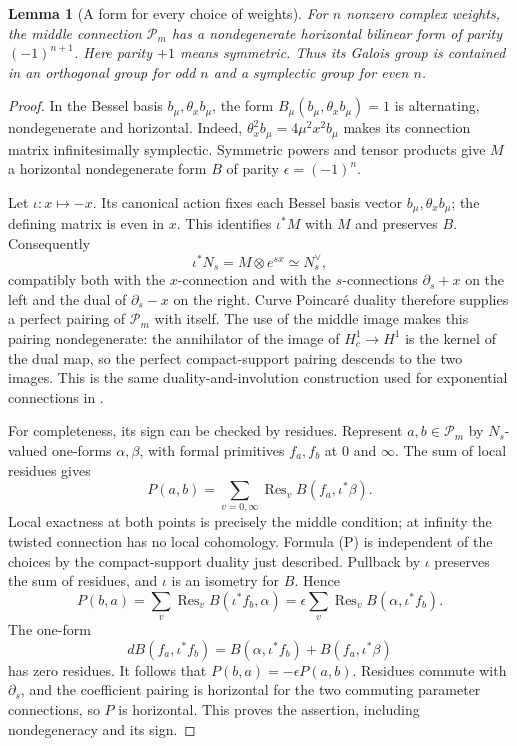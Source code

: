 \documentclass[11pt,a4paper]{article}
\newtheorem{lemma}[theorem]{Lemma}
\theoremstyle{definition}
\theoremstyle{remark}
\numberwithin{equation}{section}
\begin{document}
\begin{lemma}[A form for every choice of weights]\label{p7:fs:pairing}
For $n$ nonzero complex weights, the middle connection $\mathcal P_m$
has a nondegenerate horizontal bilinear form of parity $(-1)^{n+1}$.
Here parity $+1$ means symmetric. Thus its Galois group is contained
in an orthogonal group for odd $n$ and a symplectic group for even $n$.
\end{lemma}
\begin{proof}
In the Bessel basis $b_\mu,\theta_xb_\mu$, the form
$B_\mu(b_\mu,\theta_xb_\mu)=1$ is alternating, nondegenerate and
horizontal. Indeed, $\theta_x^2b_\mu=4\mu^2x^2b_\mu$ makes its
connection matrix infinitesimally symplectic. Symmetric powers and
tensor products give $M$ a horizontal nondegenerate form $B$ of
parity $\epsilon=(-1)^n$.

Let $\iota:x\mapsto-x$. Its canonical action fixes each Bessel
basis vector $b_\mu,\theta_xb_\mu$; the defining matrix is even in
$x$. This identifies $\iota^*M$ with $M$ and preserves $B$.
Consequently
\[
 \iota^*N_s=M\otimes e^{sx}\simeq N_s^\vee,
\]
compatibly both with the $x$-connection and with the $s$-connections
$\partial_s+x$ on the left and the dual of $\partial_s-x$ on the
right. Curve Poincar\'e duality therefore supplies a perfect pairing
of $\mathcal P_m$ with itself. The use of the middle image makes
this pairing nondegenerate: the annihilator of the image of
$H_c^1\to H^1$ is the kernel of the dual map, so the perfect
compact-support pairing descends to the two images. This is the
same duality-and-involution construction used for exponential
connections in \cite[\S2, especially (2.12) and Corollary 2.15]{p6:FS_FSY2022}.

For completeness, its sign can be checked by residues. Represent
$a,b\in\mathcal P_m$ by $N_s$-valued one-forms $\alpha,\beta$,
with formal primitives $f_a,f_b$ at $0$ and $\infty$.
The sum of local residues gives
\[
 P(a,b)=\sum_{v=0,\infty}\operatorname{Res}_v
                         B(f_a,\iota^*\beta).
 \tag{P}
\]
Local exactness at both points is precisely the middle condition;
at infinity the twisted connection has no local cohomology.
Formula (P) is independent of the choices by the compact-support
duality just described. Pullback by $\iota$ preserves the sum of
residues, and $\iota$ is an isometry for $B$. Hence
\[
 P(b,a)=\sum_v\operatorname{Res}_v B(\iota^*f_b,\alpha)
       =\epsilon\sum_v\operatorname{Res}_v B(\alpha,\iota^*f_b).
\]
The one-form
\[
 dB(f_a,\iota^*f_b)
       =B(\alpha,\iota^*f_b)+B(f_a,\iota^*\beta)
\]
has zero residues. It follows that $P(b,a)=-\epsilon P(a,b)$.
Residues commute with $\partial_s$, and the coefficient pairing is
horizontal for the two commuting parameter connections, so $P$ is
horizontal. This proves the assertion, including nondegeneracy and
its sign.
\end{proof}
\end{document}
